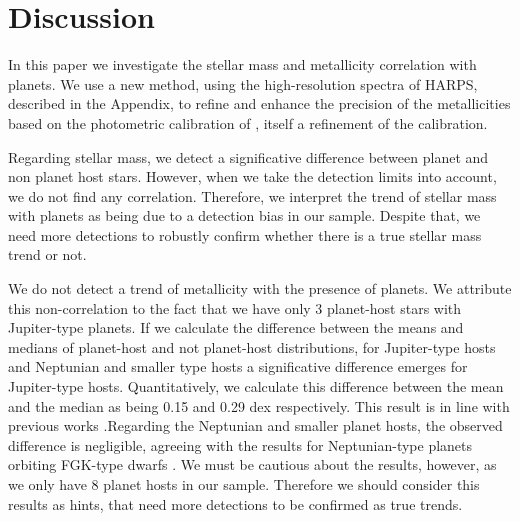 \documentclass[structabstract]{aa}
\begin{document}
\section{Discussion}
\label{discussion}

In this paper we investigate the stellar mass and metallicity correlation with planets. We use a new method, using the high-resolution spectra of HARPS, described in the Appendix, to refine and enhance the precision of the metallicities based on the photometric calibration of \citet{Neves-2012}, itself a refinement of the \citet{Schlaufman-2010} calibration.

Regarding stellar mass, we detect a significative difference between planet and non planet host stars. However, when we take the detection limits into account, we do not find any correlation. Therefore, we interpret the trend of stellar mass with planets as being due to a detection bias in our sample. Despite that, we need more detections to robustly confirm whether there is a true stellar mass trend or not.

We do not detect a trend of metallicity with the presence of planets. We attribute this non-correlation to the fact that we have only 3 planet-host stars with Jupiter-type planets. If we calculate the difference between the means and medians of planet-host and not planet-host distributions, for Jupiter-type hosts and Neptunian and smaller type hosts a significative difference emerges for Jupiter-type hosts. Quantitatively, we calculate this difference between the mean and the median as being 0.15 and 0.29 dex respectively. This result is in line with previous works \citep[e.g.][]{Bonfils-2007,Johnson-2009, Schlaufman-2010, Rojas-Ayala-2012, Terrien-2012}.Regarding the Neptunian and smaller planet hosts, the observed difference is negligible, agreeing with the results for Neptunian-type planets orbiting FGK-type dwarfs \citep[e.g][]{Sousa-2011b}. We must be cautious about the results, however, as we only have 8 planet hosts in our sample. Therefore we should consider this results as hints, that need more detections to be confirmed as true trends. 
\end{document}
